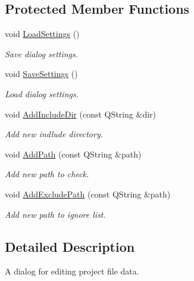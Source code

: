 \subsection*{Protected Member Functions}
\begin{DoxyCompactItemize}
\item 
void \hyperlink{class_project_file_dialog_ab7560f75cac9e4d651c26100b1983262}{Load\-Settings} ()
\begin{DoxyCompactList}\small\item\em Save dialog settings. \end{DoxyCompactList}\item 
void \hyperlink{class_project_file_dialog_abd51edee2acc7013f25ed079e578340e}{Save\-Settings} ()
\begin{DoxyCompactList}\small\item\em Load dialog settings. \end{DoxyCompactList}\item 
void \hyperlink{class_project_file_dialog_af7ab1dd4457b080d4881bcb616fc747a}{Add\-Include\-Dir} (const Q\-String \&dir)
\begin{DoxyCompactList}\small\item\em Add new indlude directory. \end{DoxyCompactList}\item 
void \hyperlink{class_project_file_dialog_a86a61015f37a31cf843e084fefcf722c}{Add\-Path} (const Q\-String \&path)
\begin{DoxyCompactList}\small\item\em Add new path to check. \end{DoxyCompactList}\item 
void \hyperlink{class_project_file_dialog_aa1d3469afe762e381cc08d316ff79bd6}{Add\-Exclude\-Path} (const Q\-String \&path)
\begin{DoxyCompactList}\small\item\em Add new path to ignore list. \end{DoxyCompactList}\end{DoxyCompactItemize}


\subsection{Detailed Description}
A dialog for editing project file data. 

